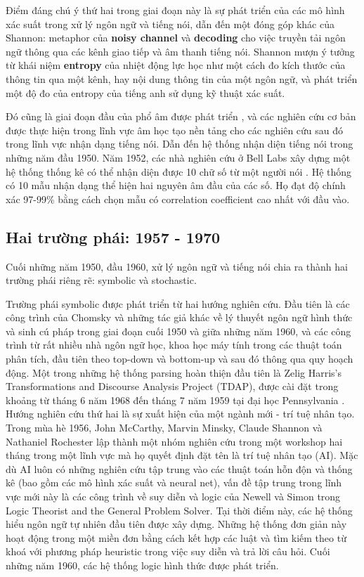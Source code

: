 Điểm đáng chú ý thứ hai trong giai đoạn này là sự phát triển của các mô hình xác suất trong xử lý ngôn ngữ và tiếng nói, dẫn đến một đóng góp khác của Shannon: metaphor của \textbf{noisy channel} và \textbf{decoding} cho việc truyền tải ngôn ngữ thông qua các kênh giao tiếp và âm thanh tiếng nói. Shannon mượn ý tưởng từ khái niệm \textbf{entropy} của nhiệt động lực học như một cách đo kích thước của thông tin qua một kênh, hay nội dung thông tin của một ngôn ngữ, và phát triển một độ đo của entropy của tiếng anh sử dụng kỹ thuật xác suất.

Đó cũng là giai đoạn đầu của phổ âm được phát triển \citep{koenig1946sound}, và các nghiên cứu cơ bản được thực hiện trong lĩnh vực âm học tạo nền tảng cho các nghiên cứu sau đó trong lĩnh vực nhận dạng tiếng nói. Dẫn đến hệ thống nhận diện tiếng nói trong những năm đầu 1950. Năm 1952, các nhà nghiên cứu ở Bell Labs xây dựng một hệ thống thống kê có thể nhận diện được 10 chữ số từ một người nói \citep{davis1952automatic}. Hệ thống có 10 mẫu nhận dạng thể hiện hai nguyên âm đầu của các số. Họ đạt độ chính xác 97-99\% bằng cách chọn mẫu có correlation coefficient cao nhất với đầu vào.

\subsection{Hai trường phái: 1957 - 1970}

Cuối những năm 1950, đầu 1960, xử lý ngôn ngữ và tiếng nói chia ra thành hai trường phái riêng rẽ: symbolic và stochastic.

Trường phái symbolic được phát triển từ hai hướng nghiên cứu. Đầu tiên là các công trình của Chomsky và những tác giả khác về lý thuyết ngôn ngữ hình thức và sinh cú pháp trong giai đoạn cuối 1950 và giữa những năm 1960, và các công trình từ rất nhiều nhà ngôn ngữ học, khoa học máy tính trong các thuật toán phân tích, đầu tiên theo top-down và bottom-up và sau đó thông qua quy hoạch động. Một trong những hệ thống parsing hoàn thiện đầu tiên là Zelig Harris's Transformations and Discourse Analysis Project (TDAP), được cài đặt trong khoảng từ tháng 6 năm 1968 đến tháng 7 năm 1959 tại đại học Pennsylvania \citep{harris1962string}. Hướng nghiên cứu thứ hai là sự xuất hiện của một ngành mới - trí tuệ nhân tạo. Trong mùa hè 1956, John McCarthy, Marvin Minsky, Claude Shannon và Nathaniel Rochester lập thành một nhóm nghiên cứu trong một workshop hai tháng trong một lĩnh vực mà họ quyết định đặt tên là trí tuệ nhân tạo (AI). Mặc dù AI luôn có những nghiên cứu tập trung vào các thuật toán hỗn độn và thống kê (bao gồm các mô hình xác suất và neural net), vấn đề tập trung trong lĩnh vực mới này là các công trình về suy diễn và logic của Newell và Simon trong Logic Theorist and the General Problem Solver. Tại thời điểm này, các hệ thống hiểu ngôn ngữ tự nhiên đầu tiên được xây dựng. Những hệ thống đơn giản này hoạt động trong một miền đơn bằng cách kết hợp các luật và tìm kiếm theo từ khoá với phương pháp heuristic trong việc suy diễn và trả lời câu hỏi. Cuối những năm 1960, các hệ thống logic hình thức được phát triển.

